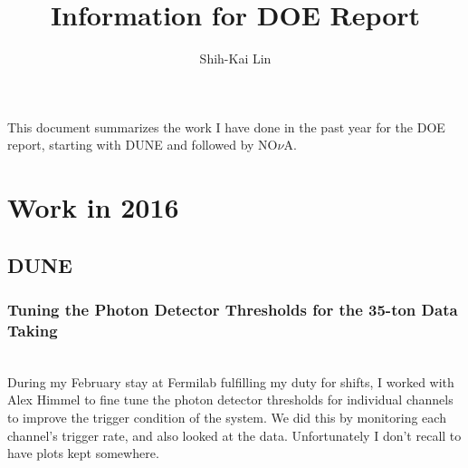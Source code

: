 \documentclass[12pt,a4paper,final]{iopart}
\begin{document}
\title[Information for DOE Report]{Information for DOE Report}
	
\author[cor1]{Shih-Kai Lin}
\address{Colorado State University}


%


\vspace{\baselineskip}
This document summarizes the work I have done in the past year for the DOE report, starting with DUNE and followed by NO$\nu$A.

\tableofcontents

\clearpage
\vspace*{\fill}
\begin{Huge}
\end{Huge}
\vspace*{\fill}
\clearpage

\section{Work in 2016}

\subsection{DUNE}

\subsubsection{Tuning the Photon Detector Thresholds for the 35-ton Data Taking}\hspace*{\fill}\\
During my February stay at Fermilab fulfilling my duty for shifts, I worked with Alex Himmel to fine tune the photon detector thresholds for individual channels to improve the trigger condition of the system. We did this by monitoring each channel's trigger rate, and also looked at the data. Unfortunately I don't recall to have plots kept somewhere.
\end{document}
